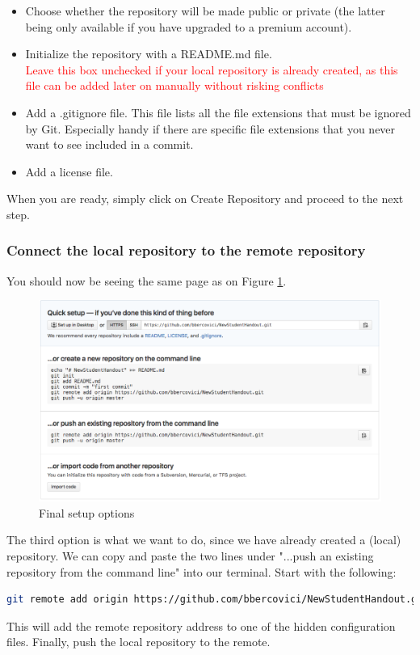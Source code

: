 \begin{itemize}
\item Choose whether the repository will be made public or private (the latter being only available if you have upgraded to a premium account).
\item Initialize the repository with a README.md file. \\\textcolor{red}{Leave this box unchecked if your local repository is already created, as this file can be added later on manually without risking conflicts}
\item Add a .gitignore file. This file lists all the file extensions that must be ignored by Git. Especially handy if there are specific file extensions that you never want to see included in a commit.
\item Add a license file.
\end{itemize}
When you are ready, simply click on Create Repository and proceed to the next step.
\subsubsection{Connect the local repository to the remote repository}
You should now be seeing the same page as on Figure \ref{fig:setup_options}. 

\begin{figure}[H]
\centering
\includegraphics[scale=0.4]{setup_options}
\caption{Final setup options}
\label{fig:setup_options}
\end{figure}
The third option is what we want to do, since we have already created a (local) repository. We can copy and paste the two lines under "...push an existing repository from the command line" into our terminal. Start with the following:
\begin{lstlisting}[language=bash, caption=Add the remote repository location ]
git remote add origin https://github.com/bbercovici/NewStudentHandout.git
\end{lstlisting}
This will add the remote repository address to one of the hidden configuration files. Finally, push the local repository to the remote.

